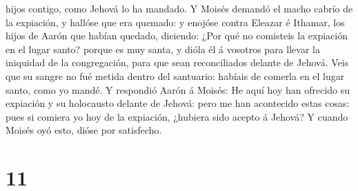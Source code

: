 hijos contigo, como Jehová lo ha mandado.  Y Moisés
demandó el macho cabrío de la expiación, y hallóse que era quemado: y
enojóse contra Eleazar é Ithamar, los hijos de Aarón que habían quedado,
diciendo:  ¿Por qué no comisteis la expiación en el lugar
santo? porque es muy santa, y dióla él á vosotros para llevar la
iniquidad de la congregación, para que sean reconciliados delante de
Jehová.  Veis que su sangre no fué metida dentro del
santuario: habíais de comerla en el lugar santo, como yo mandé.
 Y respondió Aarón á Moisés: He aquí hoy han ofrecido su
expiación y su holocausto delante de Jehová: pero me han acontecido
estas cosas: pues si comiera yo hoy de la expiación, ¿hubiera sido
acepto á Jehová?  Y cuando Moisés oyó esto, dióse por
satisfecho.

\hypertarget{section-10}{%
\section{11}\label{section-10}}

